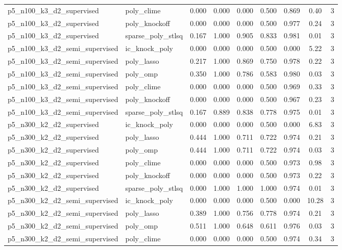 \documentclass[12pt,a4paper]{article}
\begin{document}
\begin{table}[htbp]
{\begin{tabular}{llccccccc}
  p5\_n100\_k3\_d2\_supervised & poly\_clime & 0.000 & 0.000 & 0.000 & 0.500 & 0.869 & 0.40 & 3 \\
  p5\_n100\_k3\_d2\_supervised & poly\_knockoff & 0.000 & 0.000 & 0.000 & 0.500 & 0.977 & 0.24 & 3 \\
  p5\_n100\_k3\_d2\_supervised & sparse\_poly\_stlsq & 0.167 & 1.000 & 0.905 & 0.833 & 0.981 & 0.01 & 3 \\
  p5\_n100\_k3\_d2\_semi\_supervised & ic\_knock\_poly & 0.000 & 0.000 & 0.000 & 0.500 & 0.000 & 5.22 & 3 \\
  p5\_n100\_k3\_d2\_semi\_supervised & poly\_lasso & 0.217 & 1.000 & 0.869 & 0.750 & 0.978 & 0.22 & 3 \\
  p5\_n100\_k3\_d2\_semi\_supervised & poly\_omp & 0.350 & 1.000 & 0.786 & 0.583 & 0.980 & 0.03 & 3 \\
  p5\_n100\_k3\_d2\_semi\_supervised & poly\_clime & 0.000 & 0.000 & 0.000 & 0.500 & 0.969 & 0.33 & 3 \\
  p5\_n100\_k3\_d2\_semi\_supervised & poly\_knockoff & 0.000 & 0.000 & 0.000 & 0.500 & 0.967 & 0.23 & 3 \\
  p5\_n100\_k3\_d2\_semi\_supervised & sparse\_poly\_stlsq & 0.167 & 0.889 & 0.838 & 0.778 & 0.975 & 0.01 & 3 \\
  p5\_n300\_k2\_d2\_supervised & ic\_knock\_poly & 0.000 & 0.000 & 0.000 & 0.500 & 0.000 & 6.83 & 3 \\
  p5\_n300\_k2\_d2\_supervised & poly\_lasso & 0.444 & 1.000 & 0.711 & 0.722 & 0.974 & 0.21 & 3 \\
  p5\_n300\_k2\_d2\_supervised & poly\_omp & 0.444 & 1.000 & 0.711 & 0.722 & 0.974 & 0.03 & 3 \\
  p5\_n300\_k2\_d2\_supervised & poly\_clime & 0.000 & 0.000 & 0.000 & 0.500 & 0.973 & 0.98 & 3 \\
  p5\_n300\_k2\_d2\_supervised & poly\_knockoff & 0.000 & 0.000 & 0.000 & 0.500 & 0.973 & 0.22 & 3 \\
  p5\_n300\_k2\_d2\_supervised & sparse\_poly\_stlsq & 0.000 & 1.000 & 1.000 & 1.000 & 0.974 & 0.01 & 3 \\
  p5\_n300\_k2\_d2\_semi\_supervised & ic\_knock\_poly & 0.000 & 0.000 & 0.000 & 0.500 & 0.000 & 10.28 & 3 \\
  p5\_n300\_k2\_d2\_semi\_supervised & poly\_lasso & 0.389 & 1.000 & 0.756 & 0.778 & 0.974 & 0.21 & 3 \\
  p5\_n300\_k2\_d2\_semi\_supervised & poly\_omp & 0.511 & 1.000 & 0.648 & 0.611 & 0.976 & 0.03 & 3 \\
  p5\_n300\_k2\_d2\_semi\_supervised & poly\_clime & 0.000 & 0.000 & 0.000 & 0.500 & 0.974 & 0.34 & 3 \\

\end{tabular}}
\end{table}
\end{document}
